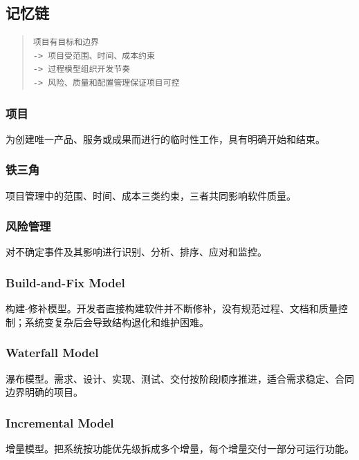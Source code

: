 \documentclass[UTF8,zihao=-4]{ctexart}
\begin{document}
\subsection{记忆链}


\begin{quote}
\footnotesize
\begin{verbatim}
项目有目标和边界
-> 项目受范围、时间、成本约束
-> 过程模型组织开发节奏
-> 风险、质量和配置管理保证项目可控
\end{verbatim}
\end{quote}


\subsubsection*{项目}


为创建唯一产品、服务或成果而进行的临时性工作，具有明确开始和结束。


\subsubsection*{铁三角}


项目管理中的范围、时间、成本三类约束，三者共同影响软件质量。


\subsubsection*{风险管理}


对不确定事件及其影响进行识别、分析、排序、应对和监控。


\subsubsection*{Build-and-Fix Model}


构建-修补模型。开发者直接构建软件并不断修补，没有规范过程、文档和质量控制；系统变复杂后会导致结构退化和维护困难。


\subsubsection*{Waterfall Model}


瀑布模型。需求、设计、实现、测试、交付按阶段顺序推进，适合需求稳定、合同边界明确的项目。


\subsubsection*{Incremental Model}


增量模型。把系统按功能优先级拆成多个增量，每个增量交付一部分可运行功能。
\end{document}
